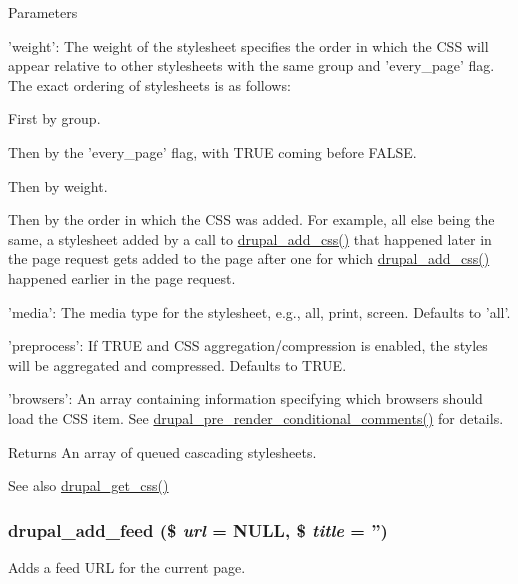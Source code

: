 \begin{DoxyParams}{Parameters}
\begin{DoxyItemize}
\item 'weight': The weight of the stylesheet specifies the order in which the CSS will appear relative to other stylesheets with the same group and 'every\_\-page' flag. The exact ordering of stylesheets is as follows:
\begin{DoxyItemize}
\item First by group.
\item Then by the 'every\_\-page' flag, with TRUE coming before FALSE.
\item Then by weight.
\item Then by the order in which the CSS was added. For example, all else being the same, a stylesheet added by a call to \hyperlink{common_8inc_a2c5bb2667efb44b02f1a105c0bfdebe5}{drupal\_\-add\_\-css()} that happened later in the page request gets added to the page after one for which \hyperlink{common_8inc_a2c5bb2667efb44b02f1a105c0bfdebe5}{drupal\_\-add\_\-css()} happened earlier in the page request.
\end{DoxyItemize}
\item 'media': The media type for the stylesheet, e.g., all, print, screen. Defaults to 'all'.
\item 'preprocess': If TRUE and CSS aggregation/compression is enabled, the styles will be aggregated and compressed. Defaults to TRUE.
\item 'browsers': An array containing information specifying which browsers should load the CSS item. See \hyperlink{common_8inc_a796bc999f4924685425e38cfb0a916ef}{drupal\_\-pre\_\-render\_\-conditional\_\-comments()} for details.
\end{DoxyItemize}\end{DoxyParams}
\begin{DoxyReturn}{Returns}
An array of queued cascading stylesheets.
\end{DoxyReturn}
\begin{DoxySeeAlso}{See also}
\hyperlink{common_8inc_a2e308371f339fbb54967045ccbe4e88c}{drupal\_\-get\_\-css()} 
\end{DoxySeeAlso}
\hypertarget{common_8inc_a42e1c8001e2609cb73a2f54f59e1020c}{
\subsubsection[{drupal\_\-add\_\-feed}]{\setlength{\rightskip}{0pt plus 5cm}drupal\_\-add\_\-feed (\$ {\em url} = {\ttfamily NULL}, \/  \$ {\em title} = {\ttfamily ''})}}
\label{common_8inc_a42e1c8001e2609cb73a2f54f59e1020c}
Adds a feed URL for the current page.


